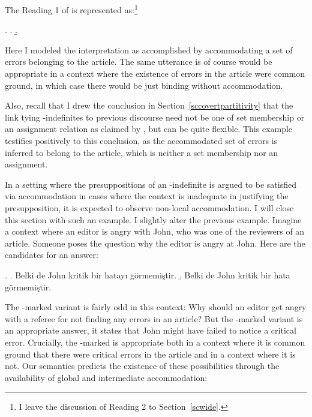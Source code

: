 \documentclass[11pt,a4paper]{article}
\begin{document}
The Reading 1 of  is represented as:\footnote{I leave
the discussion of Reading 2 to Section~\ref{scwide}.}

\ex.
\a.
\b.


Here I modeled the interpretation as accomplished by accommodating a
set of errors belonging to the article. The same utterance is of
course would be appropriate in a context where the existence of errors
in the article were common ground, in which case there would be just
binding without accommodation.

Also, recall that I drew the conclusion in
Section~\ref{sccovertpartitivity} that the link tying \acc-indefinites
to previous discourse need not be one of set membership or an
assignment relation as claimed by \cite{enc91}, but can be quite
flexible. This example testifies positively to this conclusion, as the
accommodated set of errors is inferred to belong to the article, which
is neither a set membership nor an assignment.



In a setting where the presuppositions of an \acc-indefinite is argued
to be satisfied via accommodation in cases where the context is
inadequate in justifying the presupposition, it is expected to observe
non-local accommodation. I will close this section with such an
example. I slightly alter the previous example.  Imagine a context
where an editor is angry with John, who was one of the reviewers of an
article. Someone poses the question why the editor is angry at John.
Here are the candidates for an answer: 

\ex.\label{exinter}
\a.\label{exintera}%
Belki de John kritik bir hatayı görmemiştir.
\b.\label{exinterz}%
Belki de John kritik bir hata görmemiştir.


The \zero-marked variant  is fairly odd in this
context: Why should an editor get angry with a referee for not finding
any errors in an article? But the \acc-marked variant 
is an appropriate answer, it states that John might have failed to
notice a critical error. Crucially, the \acc-marked  is
appropriate both in a context where it is common ground that there
were critical errors in the article and in a context where it is not.
Our semantics predicts the existence of these possibilities through the
availability of global and intermediate accommodation:
\end{document}
